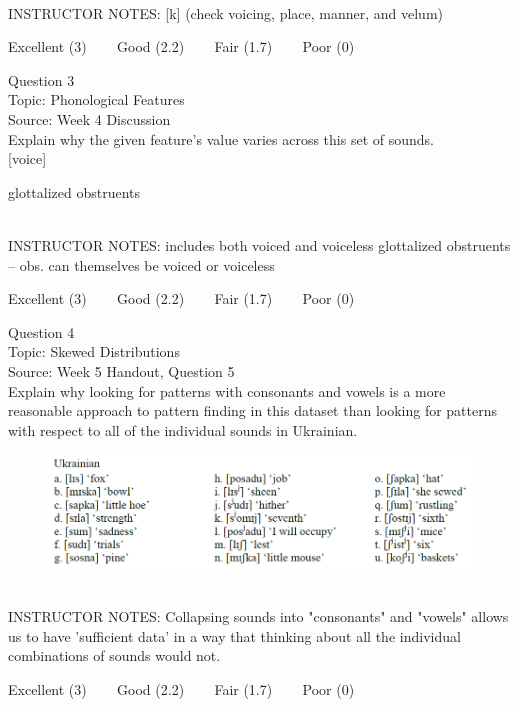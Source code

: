 \documentclass[12pt]{article}
\begin{document}
~\\
INSTRUCTOR NOTES: [k] (check voicing, place, manner, and velum)


\vfill
Excellent (3) ~~~ Good (2.2) ~~~ Fair (1.7) ~~~ Poor (0)
\newpage

{\large Question 3}\\

Topic: Phonological Features\\
Source: Week 4 Discussion\\

Explain why the given feature's value varies across this set of sounds.\\

{[voice]}

glottalized obstruents


~\\
INSTRUCTOR NOTES: includes both voiced and voiceless glottalized obstruents -- obs. can themselves be voiced or voiceless


\vfill
Excellent (3) ~~~ Good (2.2) ~~~ Fair (1.7) ~~~ Poor (0)
\newpage

{\large Question 4}\\

Topic: Skewed Distributions\\
Source: Week 5 Handout, Question 5\\

Explain why looking for patterns with consonants and vowels is a more reasonable approach to pattern finding in this dataset than looking for patterns with respect to all of the individual sounds in Ukrainian.\\

\begin{figure}[H]
\includegraphics{../images/ukrainian.png}
\end{figure}

~\\
INSTRUCTOR NOTES: Collapsing sounds into "consonants" and "vowels" allows us to have 'sufficient data' in a way that thinking about all the individual combinations of sounds would not.


\vfill
Excellent (3) ~~~ Good (2.2) ~~~ Fair (1.7) ~~~ Poor (0)
\newpage
\end{document}
